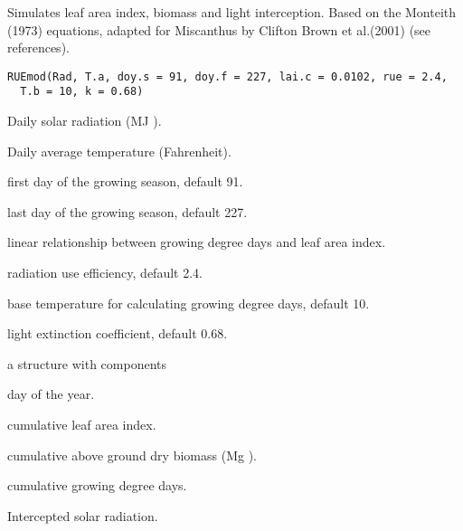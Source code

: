\documentclass[letterpaper]{book}
\begin{document}
%
\begin{Description}\relax
Simulates leaf area index, biomass and light interception.
Based on the Monteith (1973) equations, adapted for
Miscanthus by Clifton Brown et al.(2001) (see references).
\end{Description}
%
\begin{Usage}
\begin{verbatim}
RUEmod(Rad, T.a, doy.s = 91, doy.f = 227, lai.c = 0.0102, rue = 2.4,
  T.b = 10, k = 0.68)
\end{verbatim}
\end{Usage}
%
\begin{Arguments}
\begin{ldescription}
\item[\code{Rad}] Daily solar radiation (MJ ).

\item[\code{T.a}] Daily average temperature (Fahrenheit).

\item[\code{doy.s}] first day of the growing season, default
91.

\item[\code{doy.f}] last day of the growing season, default
227.

\item[\code{lai.c}] linear relationship between growing degree
days and leaf area index.

\item[\code{rue}] radiation use efficiency, default 2.4.

\item[\code{T.b}] base temperature for calculating growing
degree days, default 10.

\item[\code{k}] light extinction coefficient, default 0.68.
\end{ldescription}
\end{Arguments}
%
\begin{Value}
a  structure with components
\begin{ldescription}
\item[\code{doy}] day of the year.\item[\code{lai.cum}] cumulative leaf
area index.\item[\code{AG.cum}] cumulative above ground dry
biomass (Mg ).\item[\code{AGDD}] cumulative growing
degree days.\item[\code{Int.e}] Intercepted solar radiation.
\end{ldescription}
\end{Value}
\end{document}
